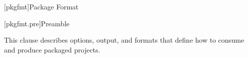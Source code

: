 
[pkgfmt]{Package Format}

[pkgfmt.pre]{Preamble}

\pnum
This clause describes options, output, and formats that define how to consume
and produce packaged \Cpp projects.
